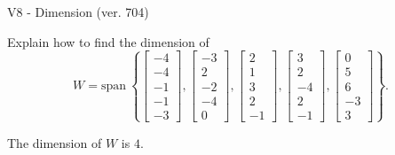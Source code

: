 \begin{exercise}
  \begin{exerciseTitle}V8 - Dimension (ver. 704)\end{exerciseTitle}
  \begin{exerciseStatement}
    Explain how to find the dimension of 
\[W=\mathrm{span}\ \left\{\left[\begin{array}{r}
-4 \\
-4 \\
-1 \\
-1 \\
-3
\end{array}\right] , \left[\begin{array}{r}
-3 \\
2 \\
-2 \\
-4 \\
0
\end{array}\right] , \left[\begin{array}{r}
2 \\
1 \\
3 \\
2 \\
-1
\end{array}\right] , \left[\begin{array}{r}
3 \\
2 \\
-4 \\
2 \\
-1
\end{array}\right] , \left[\begin{array}{r}
0 \\
5 \\
6 \\
-3 \\
3
\end{array}\right]\right\}.\]



  \end{exerciseStatement}
  \begin{exerciseAnswer}
   The dimension of \(W\) is  \(4\).
  


  \end{exerciseAnswer}
\end{exercise}